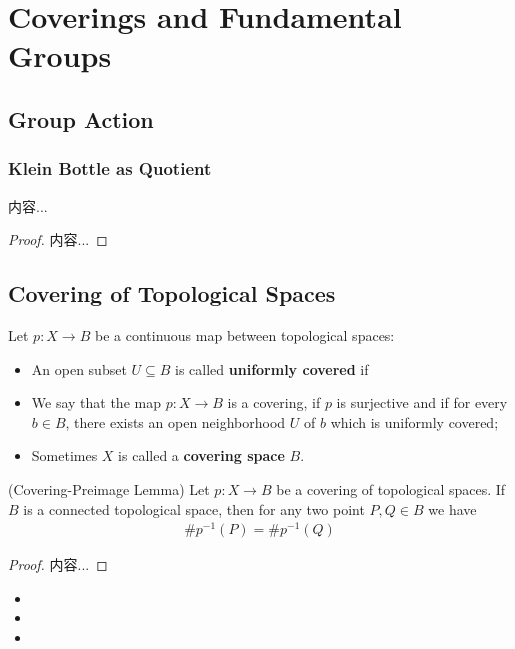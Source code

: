 \documentclass[Total.tex]{subfiles}
\begin{document}
	\section{Coverings and Fundamental Groups}
	\subsection{Group Action}
	\subsubsection{Klein Bottle as Quotient}
	\begin{lemma}
		内容...
	\end{lemma}
	\begin{proof}
		内容...
	\end{proof}
	\subsection{Covering of Topological Spaces}
	\begin{Def}
		Let $p:X\rightarrow B$ be a continuous map between topological spaces:
		\begin{itemize}
			\item An open subset $U\subseteq B$ is called \textbf{uniformly covered} if 
			\item We say that the map $p:X\rightarrow B$ is a covering, if $p$ is surjective and if for every $b\in B$, there exists an open neighborhood $U$ of $b$ which is uniformly covered;
			\item Sometimes $X$ is called a \textbf{covering space} $B$.
		\end{itemize}
	\end{Def}
	\begin{lemma}
		(Covering-Preimage Lemma) Let $p:X\rightarrow B$ be a covering of topological spaces. If $B$ is a connected topological space, then for any two point $P,Q\in B$ we have
		\begin{gather*}
			\#p^{-1}(P)=\#p^{-1}(Q)
		\end{gather*}
	\end{lemma}
	\begin{proof}
		内容...
	\end{proof}
	
	\begin{Def}
		\begin{itemize}
			\item 
			\item 
			\item 
		\end{itemize}
	\end{Def}
\end{document}
